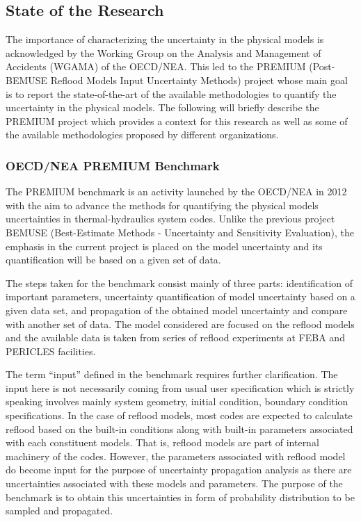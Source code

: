 \documentclass[11pt,titlepage]{article}
\begin{document}
\subsection{State of the Research}

The importance of characterizing the uncertainty in the physical models is acknowledged by the Working Group on the Analysis and Management of Accidents (WGAMA) of the OECD/NEA. 
This led to the PREMIUM (Post-BEMUSE Reflood Models Input Uncertainty Methods) project whose main goal is to report the state-of-the-art of the available methodologies to quantify the uncertainty in the physical models. 
The following will briefly describe the PREMIUM project which provides a context for this research as well as some of the available methodologies proposed by different organizations.

\subsubsection{OECD/NEA PREMIUM Benchmark}

The PREMIUM benchmark is an activity launched by the OECD/NEA in 2012 with the aim to advance the methods for quantifying the physical models uncertainties in thermal-hydraulics system codes. 
Unlike the previous project BEMUSE (Best-Estimate Methods - Uncertainty and Sensitivity Evaluation), 
the emphasis in the current project is placed on the model uncertainty and its quantification will be based on a given set of data.

The steps taken for the benchmark consist mainly of three parts: identification of important parameters, uncertainty quantification of model uncertainty based on a given data set, and propagation of the obtained model uncertainty and compare with another set of data. 
The model considered are focused on the reflood models and the available data is taken from series of reflood experiments at FEBA and PERICLES facilities.

The term ``input'' defined in the benchmark requires further clarification. 
The input here is not necessarily coming from usual user specification which is strictly speaking involves mainly system geometry, initial condition, boundary condition specifications. 
In the case of reflood models, most codes are expected to calculate reflood based on the built-in conditions along with built-in parameters associated with each constituent models. 
That is, reflood models are part of internal machinery of the codes. 
However, the parameters associated with reflood model do become input for the purpose of uncertainty propagation analysis as there are uncertainties associated with these models and parameters. 
The purpose of the benchmark is to obtain this uncertainties in form of probability distribution to be sampled and propagated. 
\end{document}
